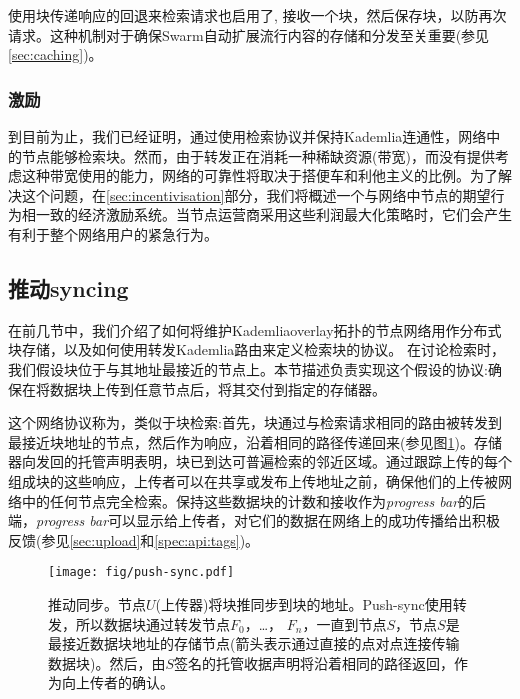 使用块传递响应的回退来检索请求也启用了, 接收一个块，然后保存块，以防再次请求。这种机制对于确保Swarm自动扩展流行内容的存储和分发至关重要(参见\ref{sec:caching})。

\subsubsection{激励}

到目前为止，我们已经证明，通过使用检索协议并保持Kademlia连通性，网络中的节点能够检索块。然而，由于转发正在消耗一种稀缺资源(带宽)，而没有提供考虑这种带宽使用的能力，网络的可靠性将取决于搭便车和利他主义的比例。为了解决这个问题，在\ref{sec:incentivisation}部分，我们将概述一个与网络中节点的期望行为相一致的经济激励系统。当节点运营商采用这些利润最大化策略时，它们会产生有利于整个网络用户的紧急行为。
 
\subsection{推动syncing\statusgreen}\label{sec:push-syncing}
 
在前几节中，我们介绍了如何将维护Kademliaoverlay拓扑的节点网络用作分布式块存储，以及如何使用转发Kademlia路由来定义检索块的协议。
在讨论检索时，我们假设块位于与其地址最接近的节点上。本节描述负责实现这个假设的协议:确保在将数据块上传到任意节点后，将其交付到指定的存储器。

这个网络协议称为，类似于块检索:首先，块通过与检索请求相同的路由被转发到最接近块地址的节点，然后作为响应，沿着相同的路径传递回来(参见图\ref{fig:push-syncing})。存储器向发回的托管声明表明，块已到达可普遍检索的邻近区域。通过跟踪上传的每个组成块的这些响应，上传者可以在共享或发布上传地址之前，确保他们的上传被网络中的任何节点完全检索。保持这些数据块的计数和接收作为\emph{progress bar}的后端，\emph{progress bar}可以显示给上传者，对它们的数据在网络上的成功传播给出积极反馈(参见\ref{sec:upload}和\ref{spec:api:tags})。


\begin{figure}[htbp]
   \centering
   \texttt{[image: fig/push-sync.pdf]}
   \caption[推动同步\statusgreen]{推动同步。节点$U$(上传器)将块推同步到块的地址。Push-sync使用转发，所以数据块通过转发节点$F_0$，…， $F_n$，一直到节点$S$，节点$S$是最接近数据块地址的存储节点(箭头表示通过直接的点对点连接传输数据块)。然后，由$S$签名的托管收据声明将沿着相同的路径返回，作为向上传者的确认。}
   \label{fig:push-syncing}
\end{figure}

